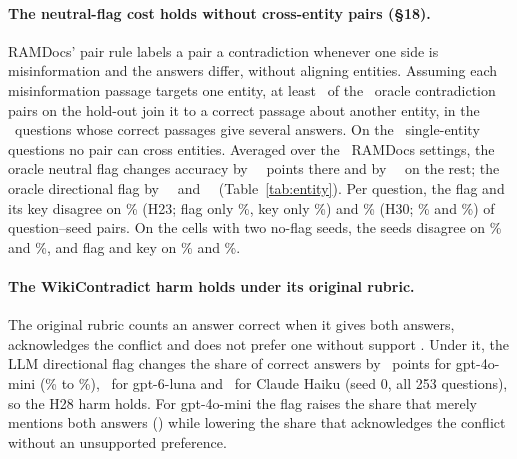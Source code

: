 \paragraph{The neutral-flag cost holds without cross-entity pairs (\S18).} RAMDocs' pair rule labels a pair a
contradiction whenever one side is misinformation and the answers differ, without aligning entities. Assuming each
misinformation passage targets one entity, at least \pairCrossLb\ of the \pairContraN\ oracle contradiction pairs on the
hold-out join it to a correct passage about another entity, in the \pairMultiN\ questions whose correct passages give
several answers. On the \pairSingleN\ single-entity questions no pair can cross entities. Averaged over the \entNeuK\
RAMDocs settings, the oracle neutral flag changes accuracy by \entNeuSingle\ \entNeuSingleCI\ points there and by
\entNeuMulti\ \entNeuMultiCI\ on the rest; the oracle directional flag by \entDirSingle\ \entDirSingleCI\ and
\entDirMulti\ \entDirMultiCI\ (Table~\ref{tab:entity}). Per question, the flag and its key disagree on \agrTwentyThreeDis\% (H23; flag only \agrTwentyThreeFlagOnly\%,
key only \agrTwentyThreeKeyOnly\%) and \agrThirtyDis\% (H30; \agrThirtyFlagOnly\% and \agrThirtyKeyOnly\%) of
question--seed pairs. On the cells with two no-flag seeds, the seeds disagree on \agrTwentyThreeNull\% and \agrThirtyNull\%,
and flag and key on \agrTwentyThreeDisMatched\% and \agrThirtyDisMatched\%.

\paragraph{The WikiContradict harm holds under its original rubric.} The original rubric counts an answer correct when it gives
both answers, acknowledges the conflict and does not prefer one without support
\citep[\S3.4]{hou2024wikicontradict}. Under it, the LLM directional flag changes the share of correct answers
by \wikiOrigMiniEff\ points for gpt-4o-mini (\wikiOrigMiniPlain\% to \wikiOrigMiniDir\%), \wikiOrigLunaEff\ for
gpt-6-luna and \wikiOrigHaikuEff\ for Claude Haiku (seed 0, all 253 questions), so the H28 harm holds. For gpt-4o-mini the flag raises the share that merely mentions both answers (\wikiBothMiniEff) while
lowering the share that acknowledges the conflict without an unsupported preference.

